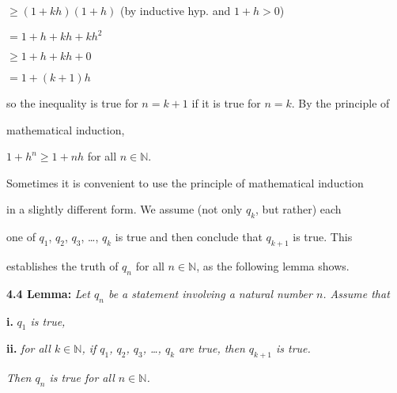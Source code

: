 \documentclass[10pt, twoside, a4paper]{article}
\newcommand*{\field}[1]{\mathbb{#1}}
\numberwithin{equation}{section}
\numberwithin{figure}{section}
\begin{document}
\hspace{2cm} $\ge (1+kh)(1+h)$ \hspace{1.5cm} (by inductive hyp. and $1+h > 0$) \vspace{0.2cm}

\hspace{2cm} $= 1 + h + kh + kh^2$ \vspace{0.2cm}

\hspace{2cm} $\ge 1 + h + kh +0$ \vspace{0.2cm}

\hspace{2cm} $= 1+ (k+1)h$ \vspace{0.2cm}

so the inequality is true for $n=k+1$ if it is true for $n=k$. By the principle of  \vspace{0.2cm}

mathematical induction, \vspace{0.2cm} 

\hspace{2cm} ${1+h}^n \ge 1+nh$ for all $n \in \field{N}$. \vspace{1cm}

Sometimes it is convenient to use the principle of mathematical induction \vspace{0.2cm}

in a slightly different form. We assume (not only $q_k$, but rather) each \vspace{0.2cm}

one of $q_1$, $q_2$, $q_3$, \dots, $q_k$ is true and then conclude that $q_{k+1}$ is true. This \vspace{0.2cm}

establishes the truth of $q_n$ for all  $n \in \field{N}$, as the following lemma shows. \vspace{1cm}

\textbf{4.4 \hspace{0.5cm} Lemma:}\textit{  Let $q_n$ be a statement involving a natural number $n$. Assume that}  \vspace{0.2cm}

\hspace{2cm}  \textbf{i.}\textit{ $q_1$ is true, } \vspace{0.2cm}

\hspace{2cm} \textbf{ii.}\textit{ for all  $k \in \field{N}$, if  $q_1$, $q_2$, $q_3$, \dots, $q_k$ are true, then $q_{k+1}$ is true. } \vspace{0.2cm}

\textit{ Then $q_n$ is true for all  $n \in \field{N}$. }
\end{document}
